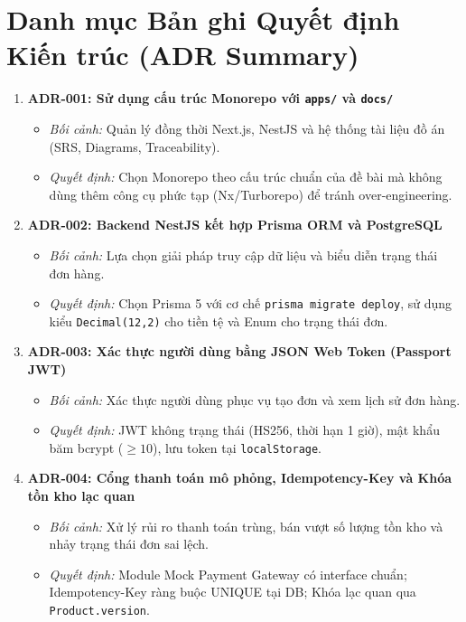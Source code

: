 \documentclass[11pt, a4paper]{article}
\begin{document}
\section{Danh mục Bản ghi Quyết định Kiến trúc (ADR Summary)}

\begin{enumerate}
	\item \textbf{ADR-001: Sử dụng cấu trúc Monorepo với \texttt{apps/} và \texttt{docs/}}
	      \begin{itemize}
		      \item \textit{Bối cảnh:} Quản lý đồng thời Next.js, NestJS và hệ thống tài liệu đồ án (SRS, Diagrams, Traceability).
		      \item \textit{Quyết định:} Chọn Monorepo theo cấu trúc chuẩn của đề bài mà không dùng thêm công cụ phức tạp (Nx/Turborepo) để tránh over-engineering.
	      \end{itemize}
	\item \textbf{ADR-002: Backend NestJS kết hợp Prisma ORM và PostgreSQL}
	      \begin{itemize}
		      \item \textit{Bối cảnh:} Lựa chọn giải pháp truy cập dữ liệu và biểu diễn trạng thái đơn hàng.
		      \item \textit{Quyết định:} Chọn Prisma 5 với cơ chế \texttt{prisma migrate deploy}, sử dụng kiểu \texttt{Decimal(12,2)} cho tiền tệ và Enum cho trạng thái đơn.
	      \end{itemize}
	\item \textbf{ADR-003: Xác thực người dùng bằng JSON Web Token (Passport JWT)}
	      \begin{itemize}
		      \item \textit{Bối cảnh:} Xác thực người dùng phục vụ tạo đơn và xem lịch sử đơn hàng.
		      \item \textit{Quyết định:} JWT không trạng thái (HS256, thời hạn 1 giờ), mật khẩu băm bcrypt ($\ge 10$), lưu token tại \texttt{localStorage}.
	      \end{itemize}
	\item \textbf{ADR-004: Cổng thanh toán mô phỏng, Idempotency-Key và Khóa tồn kho lạc quan}
	      \begin{itemize}
		      \item \textit{Bối cảnh:} Xử lý rủi ro thanh toán trùng, bán vượt số lượng tồn kho và nhảy trạng thái đơn sai lệch.
		      \item \textit{Quyết định:} Module Mock Payment Gateway có interface chuẩn; Idempotency-Key ràng buộc UNIQUE tại DB; Khóa lạc quan qua \texttt{Product.version}.

\end{itemize}
\end{enumerate}
\end{document}
